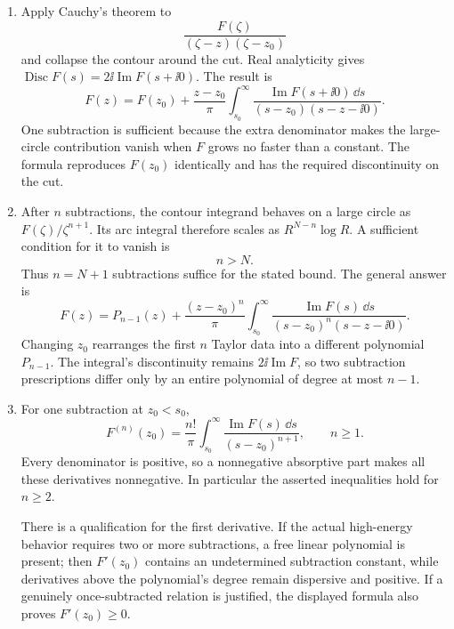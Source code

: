 \begin{enumerate}
\begin{enumerate}
\item
Apply Cauchy's theorem to
\[
 \frac{F(\zeta)}{(\zeta-z)(\zeta-z_0)}
\]
and collapse the contour around the cut.  Real analyticity gives
\(\operatorname{Disc}F(s)=2\ii\operatorname{Im}F(s+\ii0)\).  The result is
\[
 \boxed{\;
 F(z)=F(z_0)+\frac{z-z_0}{\pi}
 \int_{s_0}^{\infty}
 \frac{\operatorname{Im}F(s+\ii0)\,\dd s}
 {(s-z_0)(s-z-\ii0)}.\;}
\]
One subtraction is sufficient because the extra denominator makes the
large-circle contribution vanish when \(F\) grows no faster than a
constant.  The formula reproduces \(F(z_0)\) identically and has the
required discontinuity on the cut.
\item
After \(n\) subtractions, the contour integrand behaves on a large circle
as \(F(\zeta)/\zeta^{n+1}\).  Its arc integral therefore scales as
\(R^{N-n}\log R\).  A sufficient condition for it to vanish is
\[
 \boxed{n>N.}
\]
Thus \(n=N+1\) subtractions suffice for the stated bound.  The general
answer is
\[
 F(z)=P_{n-1}(z)
 +\frac{(z-z_0)^n}{\pi}\int_{s_0}^{\infty}
 \frac{\operatorname{Im}F(s)\,\dd s}
 {(s-z_0)^n(s-z-\ii0)}.
\]
Changing \(z_0\) rearranges the first \(n\) Taylor data into a different
polynomial \(P_{n-1}\).  The integral's discontinuity remains
\(2\ii\operatorname{Im}F\), so two subtraction prescriptions differ only by
an entire polynomial of degree at most \(n-1\).
\item
For one subtraction at \(z_0<s_0\),
\[
 F^{(n)}(z_0)=\frac{n!}{\pi}
 \int_{s_0}^{\infty}
 \frac{\operatorname{Im}F(s)\,\dd s}{(s-z_0)^{n+1}},
 \qquad n\geq1.
\]
Every denominator is positive, so a nonnegative absorptive part makes all
these derivatives nonnegative.  In particular the asserted inequalities
hold for \(n\geq2\).

There is a qualification for the first derivative.  If the actual
high-energy behavior requires two or more subtractions, a free linear
polynomial is present; then \(F'(z_0)\) contains an undetermined subtraction
constant, while derivatives above the polynomial's degree remain dispersive
and positive.  If a genuinely once-subtracted relation is justified, the
displayed formula also proves \(F'(z_0)\geq0\).
\end{enumerate}


\end{enumerate}
